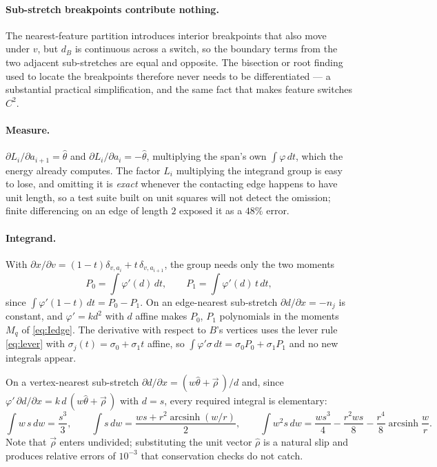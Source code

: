 \documentclass[11pt]{article}
\newcommand{\asinh}{\operatorname{arcsinh}}
\begin{document}
\paragraph{Sub-stretch breakpoints contribute nothing.} The nearest-feature partition introduces interior breakpoints that also move under $v$, but $d_B$ is continuous across a switch, so the boundary terms from the two adjacent sub-stretches are equal and opposite. The bisection or root finding used to locate the breakpoints therefore never needs to be differentiated --- a substantial practical simplification, and the same fact that makes feature switches $C^2$.

\paragraph{Measure.} $\partial L_i/\partial a_{i+1} = \hat\theta$ and $\partial L_i/\partial a_i = -\hat\theta$, multiplying the span's own $\int\varphi\,dt$, which the energy already computes. The factor $L_i$ multiplying the integrand group is easy to lose, and omitting it is \emph{exact} whenever the contacting edge happens to have unit length, so a test suite built on unit squares will not detect the omission; finite differencing on an edge of length $2$ exposed it as a $48\%$ error.

\paragraph{Integrand.} With $\partial x/\partial v = (1-t)\delta_{v,a_i} + t\,\delta_{v,a_{i+1}}$, the group needs only the two moments
\begin{equation}
P_0 = \int\varphi'(d)\,dt, \qquad P_1 = \int\varphi'(d)\,t\,dt,
\end{equation}
since $\int\varphi'(1-t)\,dt = P_0 - P_1$. On an edge-nearest sub-stretch $\partial d/\partial x = -n_j$ is constant, and $\varphi' = kd^2$ with $d$ affine makes $P_0$, $P_1$ polynomials in the moments $M_q$ of \eqref{eq:Iedge}. The derivative with respect to $B$'s vertices uses the lever rule \eqref{eq:lever} with $\sigma_j(t) = \sigma_0 + \sigma_1 t$ affine, so $\int\varphi'\sigma\,dt = \sigma_0P_0 + \sigma_1P_1$ and no new integrals appear.

On a vertex-nearest sub-stretch $\partial d/\partial x = (w\hat\theta+\vec\rho\,)/d$ and, since $\varphi'\,\partial d/\partial x = k\,d\,(w\hat\theta+\vec\rho\,)$ with $d = s$, every required integral is elementary:
\begin{equation}
\int\! w\,s\,dw = \frac{s^3}{3}, \qquad
\int\! s\,dw = \frac{w s + r^2\asinh(w/r)}{2}, \qquad
\int\! w^2 s\,dw = \frac{w s^3}{4} - \frac{r^2 w s}{8} - \frac{r^4}{8}\asinh\frac{w}{r}.
\label{eq:vecints}
\end{equation}
Note that $\vec\rho$ enters undivided; substituting the unit vector $\hat\rho$ is a natural slip and produces relative errors of $10^{-3}$ that conservation checks do not catch.
\end{document}

